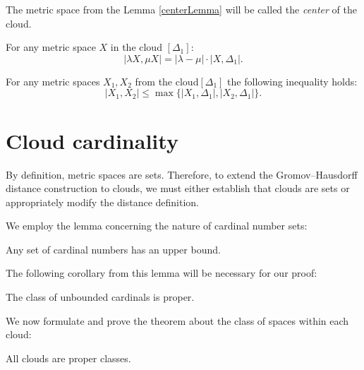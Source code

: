 \begin{definition}
  The metric space from the Lemma \ref{centerLemma} will be called
  the \emph{center} of the cloud.
\end{definition}
\begin{remark} For any metric space $X$ in the cloud $[\Delta_1]$:
  $$|\lambda X, \mu X| = |\lambda - \mu|\cdot|X,\Delta_1|.$$
\end{remark}
\begin{remark} For any metric spaces $X_{1},
  X_{2}$ from the cloud$[\Delta_{1}]$ the following inequality holds:
  $$|X_{1},X_{2}| \le \max\{|X_{1}, \Delta_{1}|,|X_{2},\Delta_{1}|\}.$$
  \label{remUltraMetric}
\end{remark}
\section{Cloud cardinality}

By definition, metric spaces are sets. Therefore, to extend the
Gromov--Hausdorff distance construction to clouds, we must either
establish that clouds are sets or appropriately modify the distance definition.

We employ the lemma concerning the nature of cardinal number sets:

\begin{lemma}
  Any set of cardinal numbers has an upper bound.
\end{lemma}

The following corollary from this lemma will be necessary for our proof:

\begin{corollary}\label{colCardinal}
  The class of unbounded cardinals is proper.
\end{corollary}

We now formulate and prove the theorem about the class of spaces
within each cloud:

\begin{theorem}
  All clouds are proper classes.
\end{theorem}

